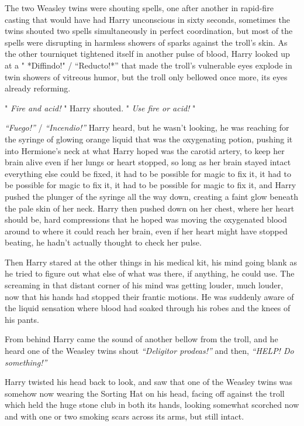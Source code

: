 The two Weasley twins were shouting spells, one after another in
rapid-fire casting that would have had Harry unconscious in sixty
seconds, sometimes the twins shouted two spells simultaneously in
perfect coordination, but most of the spells were disrupting in harmless
showers of sparks against the troll's skin. As the other tourniquet
tightened itself in another pulse of blood, Harry looked up at a "
*Diffindo!" / ``Reducto!*'' that made the troll's vulnerable eyes
explode in twin showers of vitreous humor, but the troll only bellowed
once more, its eyes already reforming.

" \emph{Fire and acid!} " Harry shouted. " \emph{Use fire or acid!} "

\emph{``Fuego!''} / \emph{``Incendio!''} Harry heard, but he wasn't
looking, he was reaching for the syringe of glowing orange liquid that
was the oxygenating potion, pushing it into Hermione's neck at what
Harry hoped was the carotid artery, to keep her brain alive even if her
lungs or heart stopped, so long as her brain stayed intact everything
else could be fixed, it had to be possible for magic to fix it, it had
to be possible for magic to fix it, it had to be possible for magic to
fix it, and Harry pushed the plunger of the syringe all the way down,
creating a faint glow beneath the pale skin of her neck. Harry then
pushed down on her chest, where her heart should be, hard compressions
that he hoped was moving the oxygenated blood around to where it could
reach her brain, even if her heart might have stopped beating, he hadn't
actually thought to check her pulse.

Then Harry stared at the other things in his medical kit, his mind going
blank as he tried to figure out what else of what was there, if
anything, he could use. The screaming in that distant corner of his mind
was getting louder, much louder, now that his hands had stopped their
frantic motions. He was suddenly aware of the liquid sensation where
blood had soaked through his robes and the knees of his pants.

From behind Harry came the sound of another bellow from the troll, and
he heard one of the Weasley twins shout \emph{``Deligitor prodeas!''}
and then, \emph{``HELP! Do something!''}

Harry twisted his head back to look, and saw that one of the Weasley
twins was somehow now wearing the Sorting Hat on his head, facing off
against the troll which held the huge stone club in both its hands,
looking somewhat scorched now and with one or two smoking scars across
its arms, but still intact.

